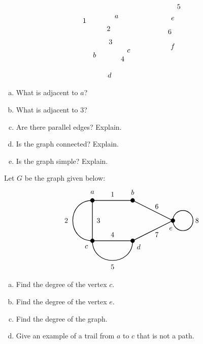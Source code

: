 \documentclass[12pt,letterpaper]{exam}
\begin{document}
\begin{questions}
\[\begin{tikzpicture}
	\node at (1.1,1.5) {$a$};
	\node at (0,-0.4) {$b$};
	\node at (1.7,-0.2) {$c$};
	\node at (0.75,-1.4) {$d$};
	\node at (3.9,1.4) {$e$};
	\node at (3.9,0) {$f$};
	
	\node at (-0.5,1.3) {$1$};
	\node at (0.7,0.9) {$2$};
	\node at (0.8,0.25) {$3$};
	\node at (1.4,-0.6) {$4$};
	\node at (4.2,2) {$5$};
	\node at (3.75,0.75) {$6$};
	\end{tikzpicture}
	\]

\begin{enumerate}[(a)]
\item What is adjacent to $a$?
\item What is adjacent to 3?
\item Are there parallel edges? Explain.
\item Is the graph connected? Explain.
\item Is the graph simple? Explain. 
\end{enumerate}



\newpage
\question[10]  Let $G$ be the graph given below:
	\[
	\begin{tikzpicture}
	\draw[line width=0.03cm] (4,1) -- (2,0) -- (0,0) -- (0,2) -- (2,2) -- (4,1);
	\draw[line width=0.03cm] (0,0) to[bend left=90, distance=1.3cm] (0,2);
	\draw[line width=0.03cm] (0,0) to[bend right=90, distance=1.3cm] (2,0);
	\draw[line width=0.03cm] (4.5,1) circle (0.5);
	
	\draw[fill=black] (0,0) circle (0.1);
	\draw[fill=black] (0,2) circle (0.1);
	\draw[fill=black] (2,2) circle (0.1);
	\draw[fill=black] (2,0) circle (0.1);
	\draw[fill=black] (4,1) circle (0.1);
	
	\node at (1,2.3) {$1$};
	\node at (-1.3,1) {$2$};
	\node at (0.3,1) {$3$};
	\node at (1,0.3) {$4$};
	\node at (1,-1.3) {$5$};
	\node at (3.2,1.7) {$6$};
	\node at (3.2,0.3) {$7$};
	\node at (5.2,1) {$8$};
	
	\node at (0,2.4) {$a$};
	\node at (2,2.4) {$b$};
	\node at (-0.3,-0.3) {$c$};
	\node at (2.3,-0.3) {$d$};
	\node at (3.9,0.6) {$e$};
	\end{tikzpicture}
	\]

\begin{enumerate}[(a)]
\item Find the degree of the vertex $c$.
\item Find the degree of the vertex $e$. 
\item Find the degree of the graph. 
\item Give an example of a trail from $a$ to $c$ that is not a path. 
\end{enumerate}




\end{questions}
\end{document}
